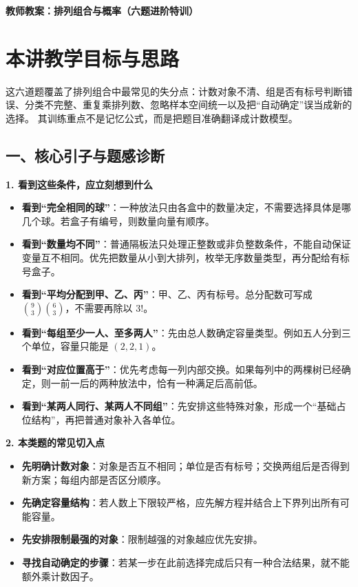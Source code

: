 \documentclass[11pt,a4paper]{ctexart}
\begin{document}
\begin{center}
  {\LARGE\bfseries 教师教案：排列组合与概率（六题进阶特训）}
\end{center}
\vspace{1em}

\section*{本讲教学目标与思路}

这六道题覆盖了排列组合中最常见的失分点：计数对象不清、组是否有标号判断错误、分类不完整、重复乘排列数、忽略样本空间统一以及把“自动确定”误当成新的选择。
其训练重点不是记忆公式，而是把题目准确翻译成计数模型。

\subsection*{一、核心引子与题感诊断}

\textbf{1. 看到这些条件，应立刻想到什么}
\begin{itemize}[itemsep=0.3em]
    \item \textbf{看到“完全相同的球”}：一种放法只由各盒中的数量决定，不需要选择具体是哪几个球。若盒子有编号，则数量向量有顺序。
    \item \textbf{看到“数量均不同”}：普通隔板法只处理正整数或非负整数条件，不能自动保证变量互不相同。优先把数量从小到大排列，枚举无序数量类型，再分配给有标号盒子。
    \item \textbf{看到“平均分配到甲、乙、丙”}：甲、乙、丙有标号。总分配数可写成 $\binom93\binom63$，不需要再除以 $3!$。
    \item \textbf{看到“每组至少一人、至多两人”}：先由总人数确定容量类型。例如五人分到三个单位，容量只能是 $(2,2,1)$。
    \item \textbf{看到“对应位置高于”}：优先考虑每一列内部交换。如果每列中的两棵树已经确定，则一前一后的两种放法中，恰有一种满足后高前低。
    \item \textbf{看到“某两人同行、某两人不同组”}：先安排这些特殊对象，形成一个“基础占位结构”，再把普通对象补入各单位。
\end{itemize}

\textbf{2. 本类题的常见切入点}
\begin{itemize}[itemsep=0.3em]
    \item \textbf{先明确计数对象}：对象是否互不相同；单位是否有标号；交换两组后是否得到新方案；每组内部是否区分顺序。
    \item \textbf{先确定容量结构}：若人数上下限较严格，应先解方程并结合上下界列出所有可能容量。
    \item \textbf{先安排限制最强的对象}：限制越强的对象越应优先安排。
    \item \textbf{寻找自动确定的步骤}：若某一步在此前选择完成后只有一种合法结果，就不能额外乘计数因子。
\end{itemize}
\end{document}
